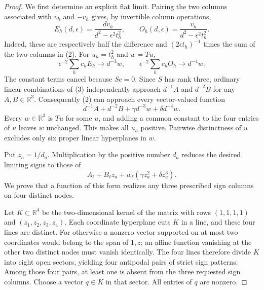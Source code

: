 \documentclass[11pt]{article}
\begin{document}
\begin{proof}
We first determine an explicit flat limit. Pairing the two columns
associated with $v_h$ and $-v_h$ gives, by invertible column operations,
\[
 E_h(d,\epsilon)=\frac{dv_h}{d^2-\epsilon^2t_h^2},\qquad
 O_h(d,\epsilon)=\frac{v_h}{d^2-\epsilon^2t_h^2}.
 \tag{3}
\]
Indeed, these are respectively half the difference and
$(2\epsilon t_h)^{-1}$ times the sum of the two columns in (2).
For $u_h=t_h^2$ and $w=Tu$,
\[
 \epsilon^{-2}\sum_h c_hE_h\longrightarrow d^{-3}w,
 \qquad
 \epsilon^{-2}\sum_h c_hO_h\longrightarrow d^{-4}w.
 \tag{4}
\]
The constant terms cancel because $Sc=0$. Since $S$ has rank three,
ordinary linear combinations of (3) independently approach $d^{-1}A$
and $d^{-2}B$ for any $A,B\in\mathbb R^3$. Consequently (2) can
approach every vector-valued function
\[
 d^{-1}A+d^{-2}B+\gamma d^{-3}w+\delta d^{-4}w.
 \tag{5}
\]
Every $w\in\mathbb R^3$ is $Tu$ for some $u$, and adding a common
constant to the four entries of $u$ leaves $w$ unchanged. This makes
all $u_h$ positive. Pairwise distinctness of $u$ excludes only six
proper linear hyperplanes in $w$.

Put $z_a=1/d_a$. Multiplication by the positive number $d_a$ reduces
the desired limiting signs to those of
\[
 A_\ell+B_\ell z_a+w_\ell(\gamma z_a^2+\delta z_a^3).
 \tag{6}
\]
We prove that a function of this form realizes any three prescribed
sign columns on four distinct nodes.

Let $K\subset\mathbb R^4$ be the two-dimensional kernel of the
matrix with rows $(1,1,1,1)$ and $(z_1,z_2,z_3,z_4)$. Each coordinate
hyperplane cuts $K$ in a line, and these four lines are distinct.
For otherwise a nonzero vector supported on at most two coordinates
would belong to the span of $1,z$; an affine function vanishing at
the other two distinct nodes must vanish identically. The four lines
therefore divide $K$ into eight open sectors, yielding four antipodal
pairs of strict sign patterns. Among those four pairs, at least one
is absent from the three requested sign columns. Choose a vector
$q\in K$ in that sector. All entries of $q$ are nonzero.


\end{proof}
\end{document}

